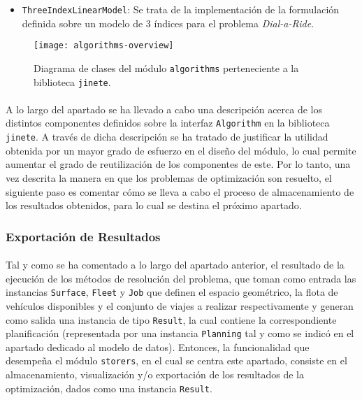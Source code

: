 \documentclass{subfiles}
\begin{document}
\begin{itemize}
\begin{itemize}
                      \item \texttt{ThreeIndexLinearModel}: Se trata de la implementación de la formulación definida sobre un modelo de 3 índices para el problema \emph{Dial-a-Ride}.
                  
                  \end{itemize}

          \end{itemize}

          \begin{sidewaysfigure}[ht]
            \centering
            \texttt{[image: algorithms-overview]}
            \caption{Diagrama de clases del módulo \texttt{algorithms} perteneciente a la biblioteca \texttt{jinete}.}
            \label{img:algorithms_overview}
          \end{sidewaysfigure}

          \paragraph{}
          A lo largo del apartado se ha llevado a cabo una descripción acerca de los distintos componentes definidos sobre la interfaz \texttt{Algorithm} en la biblioteca \texttt{jinete}. A través de dicha descripción se ha tratado de justificar la utilidad obtenida por un mayor grado de esfuerzo en el diseño del módulo, lo cual permite aumentar el grado de reutilización de los componentes de este. Por lo tanto, una vez descrita la manera en que los problemas de optimización son resuelto, el siguiente paso es comentar cómo se lleva a cabo el proceso de almacenamiento de los resultados obtenidos, para lo cual se destina el próximo apartado.

        \subsubsection{Exportación de Resultados}
        \label{sec:implementation_components_exportation}

          \paragraph{}
          Tal y como se ha comentado a lo largo del apartado anterior, el resultado de la ejecución de los métodos de resolución del problema, que toman como entrada las instancias \texttt{Surface}, \texttt{Fleet} y \texttt{Job} que definen el espacio geométrico, la flota de vehículos disponibles y el conjunto de viajes a realizar respectivamente y generan como salida una instancia de tipo \texttt{Result}, la cual contiene la correspondiente planificación (representada por una instancia \texttt{Planning} tal y como se indicó en el apartado dedicado al modelo de datos). Entonces, la funcionalidad que desempeña el módulo \texttt{storers}, en el cual se centra este apartado, consiste en el almacenamiento, visualización y/o exportación de los resultados de la optimización, dados como una instancia \texttt{Result}.
\end{document}
